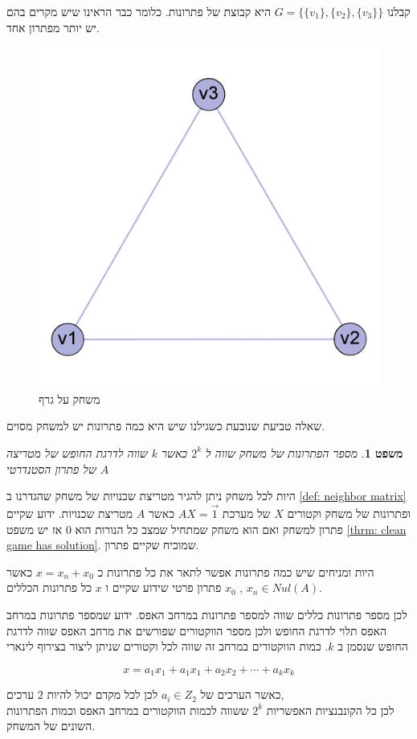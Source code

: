 \documentclass[12pt,twoside]{article}
\newtheorem{theorem}{משפט}[section]
\begin{document}
קבלנו 
$G = \{\{v_1\}, \{v_2\}, \{v_3\} \}$
היא קבוצת של פתרונות.
כלומר כבר הראינו שיש מקרים בהם יש יותר מפתרון אחד.

\begin{figure}[ht]
    \caption{משחק על גרף}
    \label{fig: clic 3 node graph game} 
    \centering
    \includegraphics[width=.5\textwidth,height=.5\textheight,keepaspectratio]{images/clic_graph_3_node.png}
\end{figure}

שאלה טביעת שנובעת כשגילנו שיש היא כמה פתרונות יש למשחק מסוים.

\begin{theorem}
    מספר הפתרונות של משחק 
    שווה ל 
    $2^{k}$
    כאשר 
    $k$
    שווה לדרגת החופש של מטריצה
    $A$
    של פתרון הסטנדרטי
\end{theorem}

היות לכל משחק ניתן להגיר מטריצת שכנויות של משחק שהגדרנו 
ב
\ref{def: neighbor matrix}
ופתרונות של משחק וקטורים
$X$
של מערכת
$A X = \vec{1}$
כאשר 
$A$
מטריצת שכנויות.
ידוע שקיים פתרון למשחק ואם הוא משחק שמתחיל שמצב כל הנורות הוא
$0$
אז יש משפט 
\ref{thrm: clean game has solution}.
שמוכיח שקיים פתרון.

היות ומניחים שיש כמה פתרונות אפשר לתאר את כל פתרונות כ
$x = x_n + x_0$
כאשר 
$x_n \in Nul(A)$ ,
$x_0$ 
פתרון פרטי שידוע שקיים 
ו
$x$
כל פתרונות הכללים.

לכן מספר פתרונות כללים שווה למספר פתרונות במרחב האפס.
ידוע שמספר פתרונות במרחב האפס תלוי לדרגת החופש ולכן מספר הווקטורים שפורשים
את מרחב האפס שווה לדרגת החופש שנסמן ב
$k$.
כמות הווקטורים במרחב זה שווה לכל וקטורים שניתן ליצור בצירוף לינארי 

\[x = a_1 x_1 + a_1 x_1 + a_2 x_2 + \cdots + a_k x_k\]

כאשר הערכים של
$a_i \in Z_2$
לכן 
לכל מקדם יכול להיות
$2$
ערכים,
\\
לכן כל הקונבנציות האפשריות 
$2^k$
ששווה
לכמות הווקטורים 
במרחב האפס וכמות הפתרונות השונים של המשחק.
\end{document}
